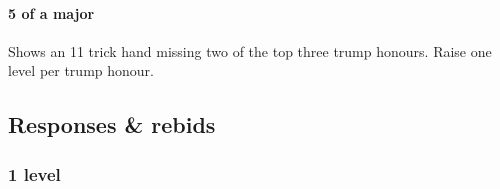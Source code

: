 \documentclass[a4paper,14pt]{extarticle}
\begin{document}
\paragraph{5 of a major}

Shows an 11 trick hand missing two of the top three trump honours. Raise one level per trump honour.

\subsection{Responses \& rebids}
\label{sec:responses}

\subsubsection{1 level}
\label{sec:resp:1level}
\end{document}
